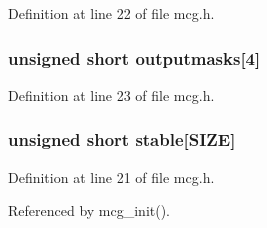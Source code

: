 Definition at line 22 of file mcg.h.
\subsubsection{\setlength{\rightskip}{0pt plus 5cm}unsigned short {\bf outputmasks}[4]}\label{mcg_8h_a21}




Definition at line 23 of file mcg.h.
\subsubsection{\setlength{\rightskip}{0pt plus 5cm}unsigned short {\bf stable}[SIZE]}\label{mcg_8h_a19}




Definition at line 21 of file mcg.h.

Referenced by mcg\_\-init().